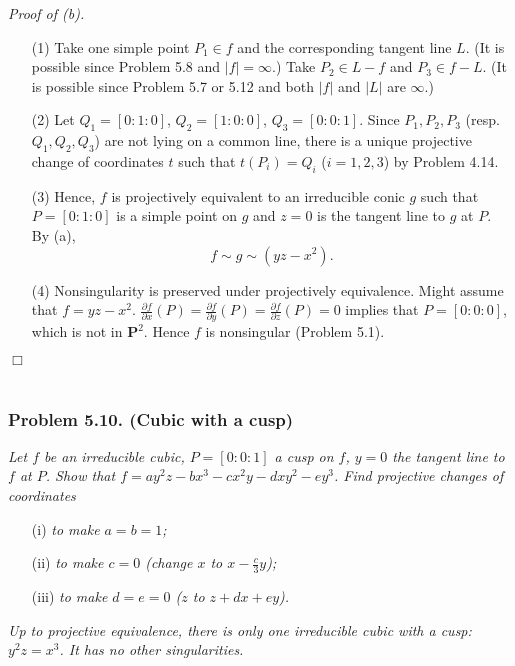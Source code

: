 \documentclass{article}
\begin{document}
\emph{Proof of (b).}
\begin{enumerate}
\item[(1)]
  Take one simple point $P_1 \in f$ and the corresponding tangent line $L$.
  (It is possible since Problem 5.8 and $|f| = \infty$.)
  Take $P_2 \in L - f$ and $P_3 \in f - L$.
  (It is possible since Problem 5.7 or 5.12 and both $|f|$ and $|L|$ are $\infty$.)

\item[(2)]
  Let $Q_1 = [0:1:0]$, $Q_2 = [1:0:0]$, $Q_3 = [0:0:1]$.
  Since $P_1, P_2, P_3$ (resp. $Q_1, Q_2, Q_3$) are not lying on a common line,
  there is a unique projective change of coordinates $t$ such that $t(P_i) = Q_i$
  ($i=1,2,3$) by Problem 4.14.

\item[(3)]
  Hence, $f$ is projectively equivalent to an irreducible conic $g$
  such that $P = [0:1:0]$ is a simple point on $g$ and
  $z=0$ is the tangent line to $g$ at $P$.
  By (a),
  \[
    f \sim g \sim (yz-x^2).
  \]

\item[(4)]
  Nonsingularity is preserved under projectively equivalence.
  Might assume that $f = yz-x^2$.
  $\frac{\partial f}{\partial x}(P)
  = \frac{\partial f}{\partial y}(P)
  = \frac{\partial f}{\partial z}(P)
  = 0$ implies that $P = [0:0:0]$, which is not in $\mathbf{P}^{2}$.
  Hence $f$ is nonsingular (Problem 5.1).

\end{enumerate}
$\Box$ \\\\






\subsubsection*{Problem 5.10. (Cubic with a cusp)}
\emph{Let $f$ be an irreducible cubic, $P = [0:0:1]$ a cusp on $f$,
$y = 0$ the tangent line to $f$ at $P$.
Show that $f = ay^2z - bx^3 - cx^2y - dxy^2 - ey^3$.
Find projective changes of coordinates}
\begin{enumerate}
\item[(i)]
  \emph{to make $a = b = 1$;}

\item[(ii)]
  \emph{to make $c = 0$ (change $x$ to $x-\frac{c}{3}y$);}

\item[(iii)]
  \emph{to make $d = e = 0$ ($z$ to $z+dx+ey$).}
\end{enumerate}
\emph{Up to projective equivalence,
there is only one irreducible cubic with a cusp: $y^2z = x^3$.
It has no other singularities.} \\
\end{document}
